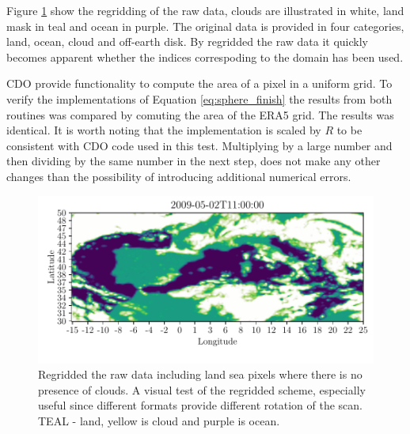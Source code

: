 Figure \ref{fig:visual_inspection_regridding} show the regridding of the raw data, clouds are illustrated in white, land mask in teal and ocean in purple. The original data is provided in four categories, land, ocean, cloud and off-earth disk. By regridded the raw data it quickly becomes apparent whether the indices correspoding to the domain has been used. 

CDO provide functionality to compute the area of a pixel in a uniform grid. To verify the implementations of Equation \ref{eq:sphere_finish} the results from both routines was compared by comuting the area of the ERA5 grid. The results was identical. It is worth noting that the implementation is scaled by $R$ to be consistent with CDO code used in this test. Multiplying by a large number and then dividing by the same number in the next step, does not make any other changes than the possibility of introducing additional numerical errors. 

\begin{figure}
    \centering
    \includegraphics{python_figs/visual_regridding.pdf}
    \caption{Regridded the raw data including land sea pixels where there is no presence of clouds. A visual test of the regridded scheme, especially useful since different formats provide different rotation of the scan. TEAL - land, yellow is cloud and purple is ocean.}
    \label{fig:visual_inspection_regridding}
\end{figure}

